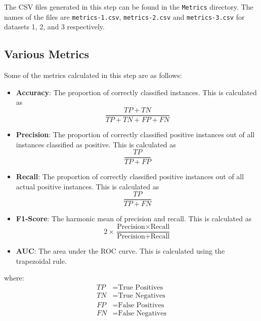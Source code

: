 \begin{remark*}
    The CSV files generated in this step can be found in the \texttt{Metrics} directory. The names of the files are \texttt{metrics-1.csv}, \texttt{metrics-2.csv} and \texttt{metrics-3.csv} for datasets 1, 2, and 3 respectively.
\end{remark*}

\clearpage

\subsection*{Various Metrics}

Some of the metrics calculated in this step are as follows:

\begin{itemize}
    \item \textbf{Accuracy}: The proportion of correctly classified instances. This is calculated as 
    \[
        \frac{TP + TN}{TP + TN + FP + FN}
    \]
    \item \textbf{Precision}: The proportion of correctly classified positive instances out of all instances classified as positive. This is calculated as 
    \[
        \frac{TP}{TP + FP}
    \]
    \item \textbf{Recall}: The proportion of correctly classified positive instances out of all actual positive instances. This is calculated as 
    \[
        \frac{TP}{TP + FN}
    \]
    \item \textbf{F1-Score}: The harmonic mean of precision and recall. This is calculated as 
    \[
        2 \times \frac{\text{Precision} \times \text{Recall}}{\text{Precision} + \text{Recall}}
    \]
    \item \textbf{AUC}: The area under the ROC curve. This is calculated using the trapezoidal rule.
\end{itemize}

where:
\begin{align*}
    TP &= \text{True Positives} \\
    TN &= \text{True Negatives} \\
    FP &= \text{False Positives} \\
    FN &= \text{False Negatives}
\end{align*}

\clearpage

